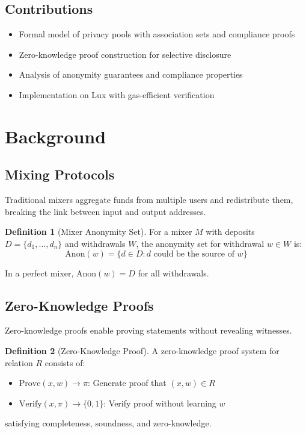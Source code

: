 \documentclass[11pt,a4paper]{article}
\theoremstyle{definition}
\newtheorem{definition}{Definition}
\begin{document}
\subsection{Contributions}

\begin{itemize}
    \item Formal model of privacy pools with association sets and compliance proofs
    \item Zero-knowledge proof construction for selective disclosure
    \item Analysis of anonymity guarantees and compliance properties
    \item Implementation on Lux with gas-efficient verification
\end{itemize}

\section{Background}

\subsection{Mixing Protocols}

Traditional mixers aggregate funds from multiple users and redistribute them, breaking the link between input and output addresses.

\begin{definition}[Mixer Anonymity Set]
For a mixer $M$ with deposits $D = \{d_1, \ldots, d_n\}$ and withdrawals $W$, the anonymity set for withdrawal $w \in W$ is:
\[
\text{Anon}(w) = \{d \in D : d \text{ could be the source of } w\}
\]
\end{definition}

In a perfect mixer, $\text{Anon}(w) = D$ for all withdrawals.

\subsection{Zero-Knowledge Proofs}

Zero-knowledge proofs enable proving statements without revealing witnesses.

\begin{definition}[Zero-Knowledge Proof]
A zero-knowledge proof system for relation $R$ consists of:
\begin{itemize}
    \item $\text{Prove}(x, w) \to \pi$: Generate proof that $(x, w) \in R$
    \item $\text{Verify}(x, \pi) \to \{0, 1\}$: Verify proof without learning $w$
\end{itemize}
satisfying completeness, soundness, and zero-knowledge.
\end{definition}
\end{document}
